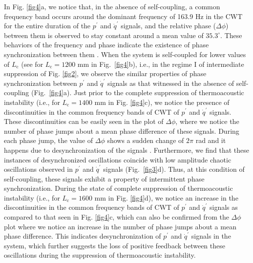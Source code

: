 \documentclass[twocolumn,10pt]{article} %
\begin{document}
In Fig. \ref{fig4}a, we notice that, in the absence of self-coupling, a common frequency band occurs around the dominant frequency of 163.9 Hz in the CWT for the entire duration of the $p^{\prime}$ and $\dot{q}^{\prime}$ signals, and the relative phase ($\Delta\phi$) between them is observed to stay constant around a mean value of $35.3^\circ$. These behaviors of the frequency and phase indicate the existence of phase synchronization between them \cite{pawar2017thermoacoustic}. When the system is self-coupled for lower values of $L_{\text{c}}$ (see for $L_{\text{c}} = 1200$ mm in Fig.~\ref{fig4}b), i.e., in the regime I of intermediate suppression of Fig. \ref{fig2}, we observe the similar properties of phase synchronization between $p^{\prime}$ and $\dot{q}^{\prime}$ signals as that witnessed in the absence of self-coupling (Fig.~\ref{fig4}a). Just prior to the complete suppression of thermoacoustic instability (i.e., for $L_{\text{c}} = 1400$ mm in Fig. \ref{fig4}c), we notice the presence of discontinuities in the common frequency bands of CWT of $p^{\prime}$ and $\dot{q}^{\prime}$ signals. These discontinuities can be easily seen in the plot of $\Delta\phi$, where we notice the number of phase jumps about a mean phase difference of these signals. During each phase jump, the value of $\Delta\phi$ shows a sudden change of $2\pi$ rad and it happens due to desynchronization of the signals \cite{pikovsky2003synchronization}. Furthermore, we find that these instances of desynchronized oscillations coincide with low amplitude chaotic oscillations observed in $p^{\prime}$ and $\dot{q}^{\prime}$ signals (Fig.~\ref{fig3}d). Thus, at this condition of self-coupling, these signals exhibit a property of intermittent phase synchronization. During the state of complete suppression of thermoacoustic instability (i.e., for $L_{\text{c}} = 1600$ mm in Fig. \ref{fig4}d),  we notice an increase in the discontinuities in the common frequency bands of CWT of $p^{\prime}$ and $\dot{q}^{\prime}$ signals as compared to that seen in Fig. \ref{fig4}c, which can also be confirmed  from the $\Delta\phi$ plot where we notice an increase in the number of phase jumps about a mean phase difference. This indicates desynchronization of $p^{\prime}$ and $\dot{q}^{\prime}$ signals in the system, which further suggests the loss of positive feedback between these oscillations during the suppression of thermoacoustic instability.
\end{document}
